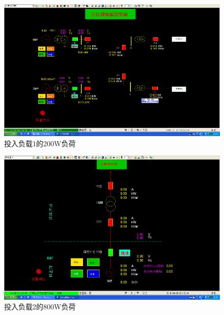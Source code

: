 \documentclass[a4paper]{ctexrep}
\begin{document}
                    \begin{figure}[htbp]
                        \centering
                        \includegraphics[width=12cm]{6.png}
                        \caption{投入负载1的200W负荷}
                    \end{figure}

                    \begin{figure}[htbp]
                        \centering
                        \includegraphics[width=12cm]{7.png}
                        \caption{投入负载2的800W负荷}
                    \end{figure}
\end{document}
